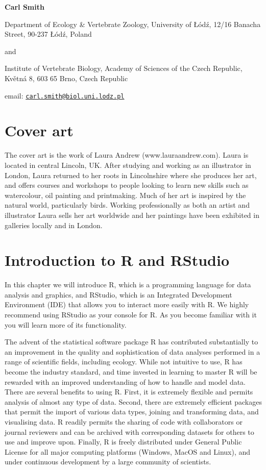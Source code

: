 \documentclass[
]{book}
\begin{document}
\textbf{Carl Smith}

Department of Ecology \& Vertebrate Zoology, University of Łódź, 12/16
Banacha Street, 90-237 Łódź, Poland

and

Institute of Vertebrate Biology, Academy of Sciences of the Czech
Republic, Květná 8, 603 65 Brno, Czech Republic

email:
\href{mailto:carl.smith@biol.uni.lodz.pl}{\nolinkurl{carl.smith@biol.uni.lodz.pl}}

\hypertarget{cover-art}{%
\chapter*{Cover art}\label{cover-art}}

The cover art is the work of Laura Andrew (www.lauraandrew.com). Laura
is located in central Lincoln, UK. After studying and working as an
illustrator in London, Laura returned to her roots in Lincolnshire where
she produces her art, and offers courses and workshops to people looking
to learn new skills such as watercolour, oil painting and printmaking.
Much of her art is inspired by the natural world, particularly birds.
Working professionally as both an artist and illustrator Laura sells her
art worldwide and her paintings have been exhibited in galleries locally
and in London.

\hypertarget{intro1}{%
\chapter{Introduction to R and RStudio}\label{intro1}}

In this chapter we will introduce R, which is a programming language for
data analysis and graphics, and RStudio, which is an Integrated
Development Environment (IDE) that allows you to interact more easily
with R. We highly recommend using RStudio as your console for R. As you
become familiar with it you will learn more of its functionality.

The advent of the statistical software package R has contributed
substantially to an improvement in the quality and sophistication of
data analyses performed in a range of scientific fields, including
ecology. While not intuitive to use, R has become the industry standard,
and time invested in learning to master R will be rewarded with an
improved understanding of how to handle and model data. There are
several benefits to using R. First, it is extremely flexible and permits
analysis of almost any type of data. Second, there are extremely
efficient packages that permit the import of various data types, joining
and transforming data, and visualising data. R readily permits the
sharing of code with collaborators or journal reviewers and can be
archived with corresponding datasets for others to use and improve upon.
Finally, R is freely distributed under General Public License for all
major computing platforms (Windows, MacOS and Linux), and under
continuous development by a large community of scientists.
\end{document}
